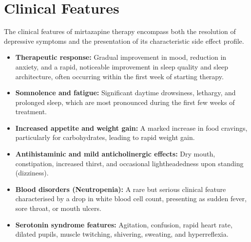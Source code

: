 \section*{Clinical Features}
The clinical features of mirtazapine therapy encompass both the resolution of depressive symptoms and the presentation of its characteristic side effect profile.
\begin{itemize}
    \item \textbf{Therapeutic response:} Gradual improvement in mood, reduction in anxiety, and a rapid, noticeable improvement in sleep quality and sleep architecture, often occurring within the first week of starting therapy.
    \item \textbf{Somnolence and fatigue:} Significant daytime drowsiness, lethargy, and prolonged sleep, which are most pronounced during the first few weeks of treatment.
    \item \textbf{Increased appetite and weight gain:} A marked increase in food cravings, particularly for carbohydrates, leading to rapid weight gain.
    \item \textbf{Antihistaminic and mild anticholinergic effects:} Dry mouth, constipation, increased thirst, and occasional lightheadedness upon standing (dizziness).
    \item \textbf{Blood disorders (Neutropenia):} A rare but serious clinical feature characterised by a drop in white blood cell count, presenting as sudden fever, sore throat, or mouth ulcers.
    \item \textbf{Serotonin syndrome features:} Agitation, confusion, rapid heart rate, dilated pupils, muscle twitching, shivering, sweating, and hyperreflexia.
\end{itemize}

